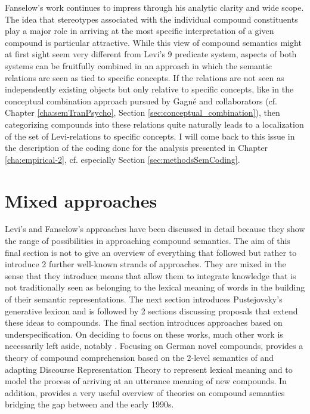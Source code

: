 Fanselow's work continues to impress through his analytic clarity and
wide scope. The idea that stereotypes associated with the individual
compound constituents play a major role in arriving at the most
specific interpretation of a given compound is particular
attractive. While this view of compound semantics might at first sight
seem very different from Levi's 9 predicate system, aspects of both systems can be fruitfully combined in an approach in which
the semantic relations are seen as tied to specific concepts. If the relations are not seen as independently existing
objects but only relative to specific concepts, like
in the conceptual combination approach pursued by Gagné and
collaborators (cf. Chapter \ref{cha:semTranPsycho}, Section \ref{sec:conceptual_combination}), then categorizing
compounds into these relations quite naturally leads to a localization
of the set of Levi-relations to specific concepts. I will come back to
this issue in the description of the coding done for the analysis presented
in Chapter \ref{cha:empirical-2}, cf. especially Section \ref{sec:methodsSemCoding}.

\section{Mixed approaches}
\label{sec:mixed_approaches}

Levi's and Fanselow's approaches have been
discussed in detail because they show the range of possibilities in
approaching compound semantics. 
The aim of this final section is not to give an overview of everything
that followed but rather to
introduce 2 further well-known strands of approaches. They are mixed in the sense that
they introduce means that allow them to integrate knowledge that is
not traditionally seen as belonging to the lexical meaning of
words in the building of their semantic representations. The next section introduces Pustejovsky's generative lexicon
and is followed by 2 sections discussing proposals that extend these
ideas to compounds. The final section introduces approaches based on
underspecification. On deciding to focus on these works, much other
work is necessarily left aside, notably
\citet{Meyer:1993}. 
Focusing on German novel compounds, \citet{Meyer:1993} provides a theory of compound
comprehension based on the 2-level semantics of
\citet{Bierwisch:1989} and adapting Discourse Representation Theory
\citep{Kamp:1981} to
represent lexical meaning and to model the process of arriving at an
utterance meaning of new compounds. In addition, \citet[12--38]{Meyer:1993} provides a very useful overview
of theories on compound semantics bridging the gap between \citet{Fanselow:1981} and the
early 1990s. 


